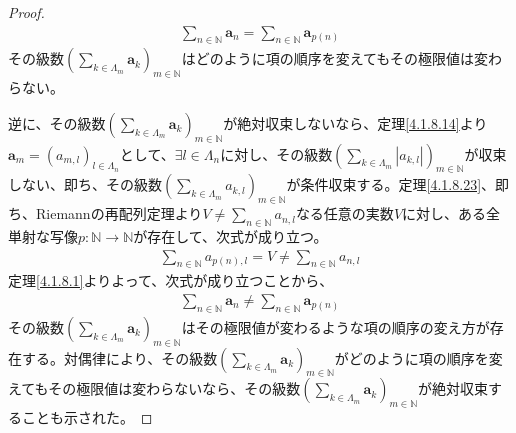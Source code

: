 \documentclass[dvipdfmx]{jsarticle}
\begin{document}
\begin{proof}
\begin{align*}
\sum_{n \in \mathbb{N}} \mathbf{a}_{n} = \sum_{n \in \mathbb{N}} \mathbf{a}_{p(n)}
\end{align*}
その級数$\left( \sum_{k \in \varLambda_{m}} \mathbf{a}_{k} \right)_{m \in \mathbb{N}}$はどのように項の順序を変えてもその極限値は変わらない。\par
逆に、その級数$\left( \sum_{k \in \varLambda_{m}} \mathbf{a}_{k} \right)_{m \in \mathbb{N}}$が絶対収束しないなら、定理\ref{4.1.8.14}より$\mathbf{a}_{m} = \left( a_{m,l} \right)_{l \in \varLambda_{n}}$として、$\exists l \in \varLambda_{n}$に対し、その級数$\left( \sum_{k \in \varLambda_{m}} \left| a_{k,l} \right| \right)_{m \in \mathbb{N}}$が収束しない、即ち、その級数$\left( \sum_{k \in \varLambda_{m}} a_{k,l} \right)_{m \in \mathbb{N}}$が条件収束する。定理\ref{4.1.8.23}、即ち、Riemannの再配列定理より$V \neq \sum_{n \in \mathbb{N}} a_{n,l}$なる任意の実数$V$に対し、ある全単射な写像$p:\mathbb{N} \rightarrow \mathbb{N}$が存在して、次式が成り立つ。
\begin{align*}
\sum_{n \in \mathbb{N}} a_{p(n),l} = V \neq \sum_{n \in \mathbb{N}} a_{n,l}
\end{align*}
定理\ref{4.1.8.1}よりよって、次式が成り立つことから、
\begin{align*}
\sum_{n \in \mathbb{N}} \mathbf{a}_{n} \neq \sum_{n \in \mathbb{N}} \mathbf{a}_{p(n)}
\end{align*}
その級数$\left( \sum_{k \in \varLambda_{m}} \mathbf{a}_{k} \right)_{m \in \mathbb{N}}$はその極限値が変わるような項の順序の変え方が存在する。対偶律により、その級数$\left( \sum_{k \in \varLambda_{m}} \mathbf{a}_{k} \right)_{m \in \mathbb{N}}$がどのように項の順序を変えてもその極限値は変わらないなら、その級数$\left( \sum_{k \in \varLambda_{m}} \mathbf{a}_{k} \right)_{m \in \mathbb{N}}$が絶対収束することも示された。
\end{proof}
\end{document}
